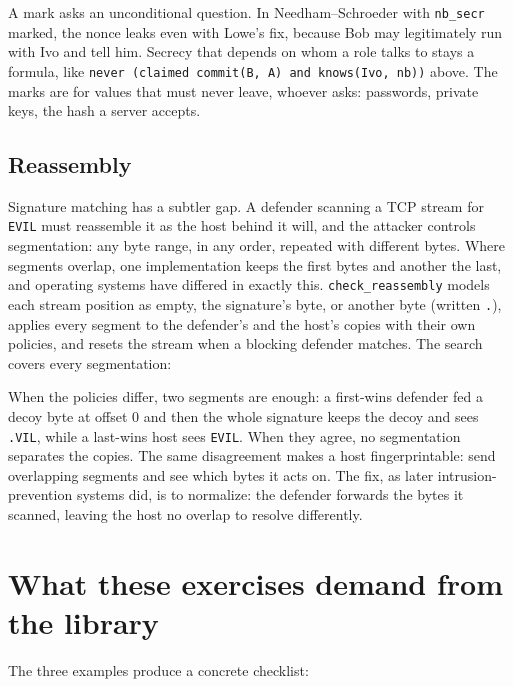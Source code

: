 A mark asks an unconditional question. In Needham--Schroeder with
\texttt{nb\_secr} marked, the nonce leaks even with Lowe's fix, because Bob may
legitimately run with Ivo and tell him. Secrecy that depends on whom a role
talks to stays a formula, like \texttt{never (claimed commit(B, A) and
knows(Ivo, nb))} above. The marks are for values that must never leave, whoever
asks: passwords, private keys, the hash a server accepts.

\subsection{Reassembly}
\label{sec:reassembly}

Signature matching has a subtler gap. A defender scanning a TCP stream for
\texttt{EVIL} must reassemble it as the host behind it will, and the attacker
controls segmentation: any byte range, in any order, repeated with different
bytes. Where segments overlap, one implementation keeps the first bytes and
another the last, and operating systems have differed in exactly this.
\texttt{check\_reassembly} models each stream position as empty, the signature's
byte, or another byte (written \texttt{.}), applies every segment to the
defender's and the host's copies with their own policies, and resets the stream
when a blocking defender matches. The search covers every segmentation:

\begin{center}

\end{center}

When the policies differ, two segments are enough: a first-wins defender fed a
decoy byte at offset 0 and then the whole signature keeps the decoy and sees
\texttt{.VIL}, while a last-wins host sees \texttt{EVIL}. When they agree, no
segmentation separates the copies. The same disagreement makes a host
fingerprintable: send overlapping segments and see which bytes it acts on. The fix,
as later intrusion-prevention systems did, is to normalize: the defender forwards
the bytes it scanned, leaving the host no overlap to resolve differently.

\section{What these exercises demand from the library}

The three examples produce a concrete checklist:

